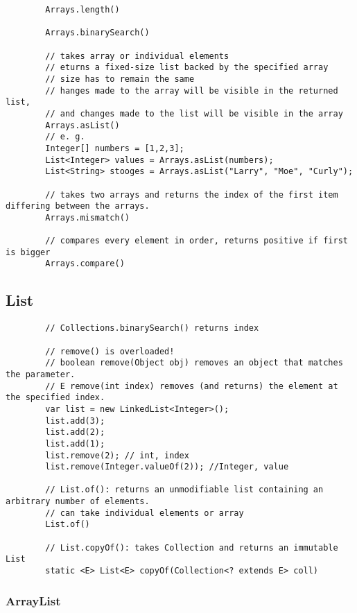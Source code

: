\documentclass{scrartcl}
\begin{document}
    \begin{lstlisting}
        Arrays.length()

        Arrays.binarySearch()

        // takes array or individual elements
        // eturns a fixed-size list backed by the specified array
        // size has to remain the same
        // hanges made to the array will be visible in the returned list,
        // and changes made to the list will be visible in the array
        Arrays.asList()
        // e. g.
        Integer[] numbers = [1,2,3];
        List<Integer> values = Arrays.asList(numbers);
        List<String> stooges = Arrays.asList("Larry", "Moe", "Curly");

        // takes two arrays and returns the index of the first item differing between the arrays.
        Arrays.mismatch()

        // compares every element in order, returns positive if first is bigger
        Arrays.compare()

    \end{lstlisting}


\subsection{List}

    \begin{lstlisting}
        // Collections.binarySearch() returns index

        // remove() is overloaded!
        // boolean remove(Object obj) removes an object that matches the parameter.
        // E remove(int index) removes (and returns) the element at the specified index.
        var list = new LinkedList<Integer>();
        list.add(3);
        list.add(2);
        list.add(1);
        list.remove(2); // int, index
        list.remove(Integer.valueOf(2)); //Integer, value

        // List.of(): returns an unmodifiable list containing an arbitrary number of elements.
        // can take individual elements or array
        List.of()

        // List.copyOf(): takes Collection and returns an immutable List
        static <E> List<E> copyOf(Collection<? extends E> coll)
        \end{lstlisting}


\subsubsection{ArrayList}
\end{document}
